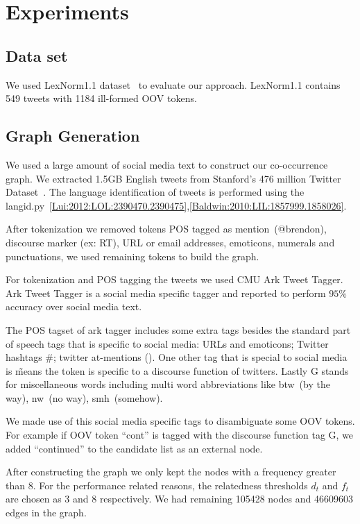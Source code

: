 \section{Experiments}
\label{sec:experiments}

\subsection{Data set}
We used LexNorm1.1 dataset~\cite{Han:2011:LNS:2002472.2002520} to evaluate our approach. LexNorm1.1 contains 549 tweets with 1184 ill-formed OOV tokens.

\subsection{Graph Generation}
We used a large amount of social media text to construct our co-occurrence graph. We extracted 1.5GB English tweets from Stanford's 476 million Twitter Dataset~\cite{DBLP:conf/wsdm/YangL11}. The language identification of tweets is performed using the langid.py~\ref{Lui:2012:LOL:2390470.2390475},\ref{Baldwin:2010:LIL:1857999.1858026}.

After tokenization we removed tokens POS tagged as mention~(@brendon), discourse marker (ex: RT), URL or email addresses, emoticons, numerals and punctuations, we used remaining tokens to build the graph.

For tokenization and POS tagging the tweets we used CMU Ark Tweet Tagger\cite{DBLP:conf/naacl/OwoputiODGSS13}\cite{Gimpel:2011:PTT:2002736.2002747}. Ark Tweet Tagger is a social media specific tagger and reported to perform $95\%$ accuracy over social media text.

The POS tagset of ark tagger includes some extra tags besides the standard part of speech tags that is specific to social media: URLs and emoticons; Twitter hashtags \#; twitter at-mentions (\@). One other tag that is special to social media is \~ means the token is specific to a discourse function of twitters. Lastly G stands for miscellaneous words including multi word abbreviations like btw~(by the way), nw~(no way), smh~(somehow).

We made use of this social media specific tags to disambiguate some OOV tokens. For example if OOV token ``cont'' is tagged with the discourse function tag G, we added ``continued'' to the candidate list as an external node.

After constructing the graph we only kept the nodes with a frequency greater than 8. For the performance related reasons, the relatedness thresholds $d_t$ and $f_t$  are chosen as 3 and 8 respectively. We had remaining 105428 nodes and 46609603 edges in the graph.

